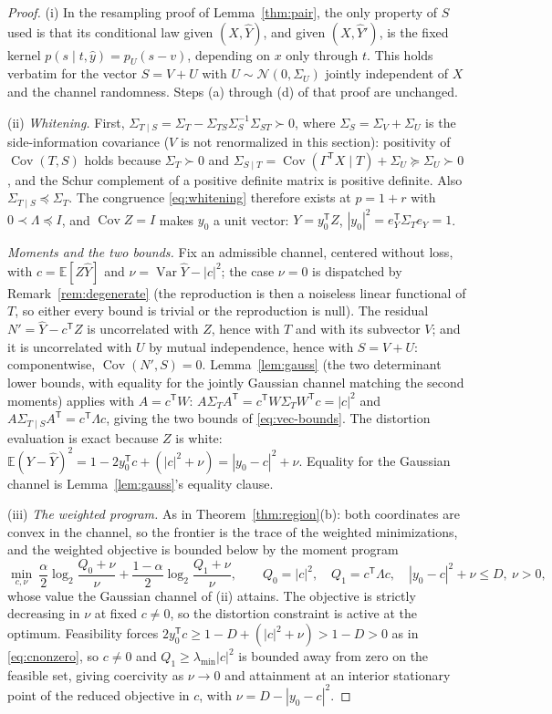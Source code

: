 \documentclass[11pt,onecolumn]{IEEEtran}
\newcommand{\E}{\mathbb{E}}
\newcommand{\Cov}{\operatorname{Cov}}
\newcommand{\hY}{\widehat{Y}}
\begin{document}
\begin{proof}
(i) In the resampling proof of Lemma~\ref{thm:pair}, the only
property of $S$ used is that its conditional law given $(X,\hY)$, and
given $(X,\hY')$, is the fixed kernel
$p(s\mid t,\hat y)=p_U(s-v)$, depending on $x$ only through $t$. This
holds verbatim for the vector $S=V+U$ with
$U\sim\mathcal N(0,\Sigma_U)$ jointly independent of $X$ and the
channel randomness. Steps (a) through (d) of that proof are unchanged.

(ii) \emph{Whitening.} First,
$\Sigma_{T\mid S}=\Sigma_T-\Sigma_{TS}\Sigma_S^{-1}\Sigma_{ST}\succ0$,
where $\Sigma_S=\Sigma_V+\Sigma_U$ is the side-information covariance
($V$ is not renormalized in this section):
positivity of $\Cov(T,S)$ holds because $\Sigma_T\succ0$ and
$\Sigma_{S\mid T}=\Cov(\Gamma^{\mathsf T}X\mid T)+\Sigma_U\succeq
\Sigma_U\succ0$, and the Schur complement of a positive definite
matrix is positive definite. Also $\Sigma_{T\mid S}\preceq\Sigma_T$.
The congruence \eqref{eq:whitening} therefore exists at $p=1+r$ with
$0\prec\Lambda\preceq I$, and $\Cov Z=I$ makes $y_0$ a unit vector:
$Y=y_0^{\mathsf T}Z$, $|y_0|^2=e_Y^{\mathsf T}\Sigma_Te_Y=1$.

\emph{Moments and the two bounds.} Fix an admissible channel, centered
without loss, with $c=\E[Z\hY]$ and
$\nu=\operatorname{Var}\hY-|c|^2$; the case $\nu=0$ is dispatched by
Remark~\ref{rem:degenerate} (the reproduction is then a noiseless
linear functional of $T$, so either every bound is trivial or the
reproduction is null). The residual $N'=\hY-c^{\mathsf T}Z$ is
uncorrelated with $Z$, hence with $T$ and with its subvector $V$; and
it is uncorrelated with $U$ by mutual independence, hence with
$S=V+U$: componentwise, $\Cov(N',S)=0$. Lemma~\ref{lem:gauss} (the two
determinant lower bounds, with equality for the jointly Gaussian
channel matching the second moments) applies with $A=c^{\mathsf T}W$:
$A\Sigma_TA^{\mathsf T}=c^{\mathsf T}W\Sigma_TW^{\mathsf T}c=|c|^2$
and
$A\Sigma_{T\mid S}A^{\mathsf T}=c^{\mathsf T}\Lambda c$, giving the
two bounds of \eqref{eq:vec-bounds}. The distortion evaluation is
exact because $Z$ is white:
$\E(Y-\hY)^2=1-2y_0^{\mathsf T}c+(|c|^2+\nu)=|y_0-c|^2+\nu$. Equality for
the Gaussian channel is Lemma~\ref{lem:gauss}'s equality clause.

(iii) \emph{The weighted program.} As in
Theorem~\ref{thm:region}(b): both coordinates are convex in the channel,
so the frontier is the trace of the weighted minimizations, and the
weighted objective is bounded below by the moment program
\[
\min_{c,\nu}\
\frac\alpha2\log_2\frac{Q_0+\nu}{\nu}
+\frac{1-\alpha}2\log_2\frac{Q_1+\nu}{\nu},
\qquad
Q_0=|c|^2,\quad
Q_1=c^{\mathsf T}\Lambda c,\quad
|y_0-c|^2+\nu\le D,\ \nu>0,
\]
whose value the Gaussian channel of (ii) attains. The objective is
strictly decreasing in $\nu$ at fixed $c\ne0$, so the distortion
constraint is active at the optimum. Feasibility forces
$2y_0^{\mathsf T}c\ge1-D+(|c|^2+\nu)>1-D>0$ as in \eqref{eq:cnonzero}, so
$c\ne0$ and $Q_1\ge\lambda_{\min}|c|^2$ is bounded away from zero on
the feasible set, giving coercivity as $\nu\to0$ and attainment at an
interior stationary point of the reduced objective in $c$, with
$\nu=D-|y_0-c|^2$.


\end{proof}
\end{document}
